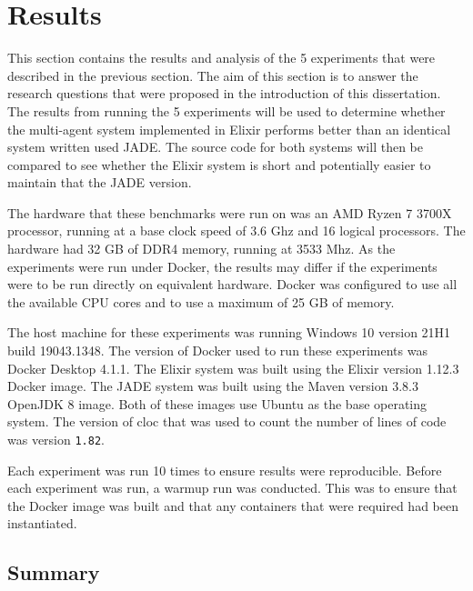 \section{Results}

This section contains the results and analysis of the 5 experiments that were described in the previous section.
The aim of this section is to answer the research questions that were proposed in the introduction of this dissertation.
The results from running the 5 experiments will be used to determine whether the multi-agent system implemented in Elixir performs better than an identical system written used JADE\@.
The source code for both systems will then be compared to see whether the Elixir system is short and potentially easier to maintain that the JADE version.

The hardware that these benchmarks were run on was an AMD Ryzen 7 3700X processor, running at a base clock speed of 3.6 Ghz and 16 logical processors.
The hardware had 32 GB of DDR4 memory, running at 3533 Mhz.
As the experiments were run under Docker, the results may differ if the experiments were to be run directly on equivalent hardware.
Docker was configured to use all the available CPU cores and to use a maximum of 25 GB of memory.

The host machine for these experiments was running Windows 10 version 21H1 build 19043.1348.
The version of Docker used to run these experiments was Docker Desktop 4.1.1.
The Elixir system was built using the Elixir version 1.12.3 Docker image.
The JADE system was built using the Maven version 3.8.3 OpenJDK 8 image.
Both of these images use Ubuntu as the base operating system.
The version of cloc that was used to count the number of lines of code was version \verb|1.82|.

Each experiment was run 10 times to ensure results were reproducible.
Before each experiment was run, a warmup run was conducted.
This was to ensure that the Docker image was built and that any containers that were required had been instantiated.









\subsection{Summary}

